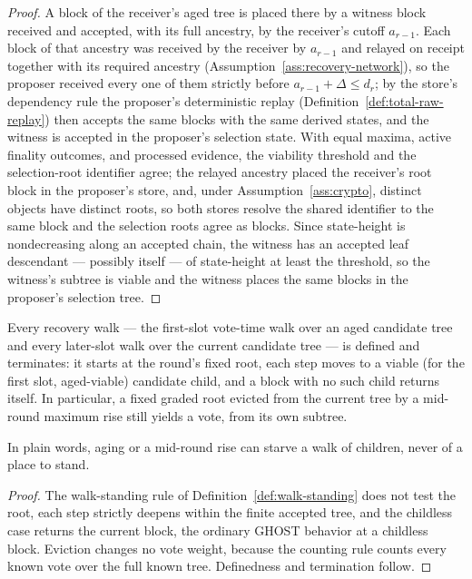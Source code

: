\begin{proof}
A block of the receiver's aged tree is placed there by a witness block
received and accepted, with its full ancestry, by the receiver's cutoff
\(a_{r-1}\).  Each block of that ancestry was received by the receiver
by \(a_{r-1}\) and relayed on receipt together with its required
ancestry (Assumption~\ref{ass:recovery-network}), so the proposer
received every one of them strictly before \(a_{r-1}+\Delta\leq d_r\);
by the store's dependency rule the proposer's deterministic replay
(Definition~\ref{def:total-raw-replay}) then accepts the same blocks
with the same derived states, and the witness is accepted in the
proposer's selection state.  With equal maxima, active finality
outcomes, and processed evidence, the viability threshold and the
selection-root identifier agree; the relayed ancestry placed the
receiver's root block in the proposer's store, and, under
Assumption~\ref{ass:crypto}, distinct objects have distinct roots, so
both stores resolve the shared identifier to the same block and the
selection roots agree as blocks.  Since state-height is nondecreasing
along an accepted chain, the witness has an accepted leaf descendant
--- possibly itself --- of state-height at least the threshold, so the
witness's subtree is viable and the witness places the same blocks in
the proposer's selection tree.
\end{proof}

\begin{lemma}
\label{lem:aged-walk-total}
Every recovery walk --- the first-slot vote-time walk over an aged
candidate tree and every later-slot walk over the current candidate
tree --- is defined and terminates: it starts at the round's fixed
root, each step moves to a viable (for the first slot, aged-viable)
candidate child, and a block with no such child returns itself.  In
particular, a fixed graded root evicted from the current tree by a
mid-round maximum rise still yields a vote, from its own subtree.

In plain words, aging or a mid-round rise can starve a walk of
children, never of a place to stand.
\end{lemma}

\begin{proof}
The walk-standing rule of Definition~\ref{def:walk-standing} does
not test the root, each step strictly deepens within the finite
accepted tree, and the childless case returns the current block, the
ordinary GHOST behavior at a childless block.  Eviction changes no vote
weight, because the counting rule counts every known vote over the full
known tree.  Definedness and termination follow.
\end{proof}

